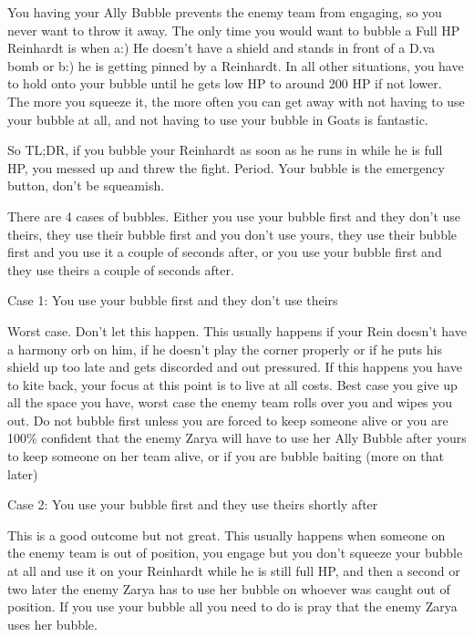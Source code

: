 You having your Ally Bubble prevents the enemy team from engaging, so you never want to throw it away. The only time you would want to bubble a Full HP Reinhardt is when a:) He doesn’t have a shield and stands in front of a D.va bomb or b:) he is getting pinned by a Reinhardt. In all other situations, you have to hold onto your bubble until he gets low HP to around 200 HP if not lower. The more you squeeze it, the more often you can get away with not having to use your bubble at all, and not having to use your bubble in Goats is fantastic.

So TL;DR, if you bubble your Reinhardt as soon as he runs in while he is full HP, you messed up and threw the fight. Period. Your bubble is the emergency button, don’t be squeamish. 

There are 4 cases of bubbles. Either you use your bubble first and they don’t use theirs, they use their bubble first and you don’t use yours, they use their bubble first and you use it a couple of seconds after, or you use your bubble first and they use theirs a couple of seconds after.







Case 1: You use your bubble first and they don’t use theirs

Worst case. Don’t let this happen. This usually happens if your Rein doesn’t have a harmony orb on him, if he doesn’t play the corner properly or if he puts his shield up too late and gets discorded and out pressured. If this happens you have to kite back, your focus at this point is to live at all costs. Best case you give up all the space you have, worst case the enemy team rolls over you and wipes you out. Do not bubble first unless you are forced to keep someone alive or you are 100\% confident that the enemy Zarya will have to use her Ally Bubble after yours to keep someone on her team alive, or if you are bubble baiting (more on that later)


Case 2: You use your bubble first and they use theirs shortly after

This is a good outcome but not great. This usually happens when someone on the enemy team is out of position, you engage but you don’t squeeze your bubble at all and use it on your Reinhardt while he is still full HP, and then a second or two later the enemy Zarya has to use her bubble on whoever was caught out of position. If you use your bubble all you need to do is pray that the enemy Zarya uses her bubble.

